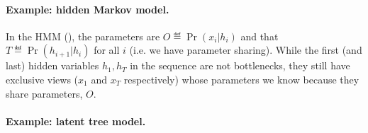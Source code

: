 \begin{figure}
  \centering
  \caption{}
  \label{fig:examples}
\end{figure}


\paragraph{Example: hidden Markov model.}

In the HMM (), the parameters
are $O \eqdef \Pr(x_i|h_i)$  and that $T \eqdef \Pr(h_{i+1} | h_i)$
for all $i$ (i.e. we have parameter sharing).
While the first (and last) hidden variables $h_1, h_T$ in the
  sequence are not bottlenecks, they still have exclusive views ($x_1$ and
  $x_T$ respectively) whose parameters we know because they share
  parameters, $O$.

\paragraph{Example: latent tree model.}

